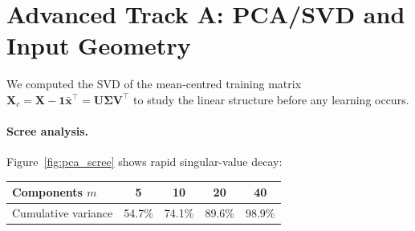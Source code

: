 \documentclass[11pt]{article}
\newcommand{\R}{\mathbb{R}}
\newcommand{\bx}{\mathbf{x}}
\newcommand{\bX}{\mathbf{X}}
\newcommand{\bone}{\mathbf{1}}
\begin{document}



\section{Advanced Track A: PCA/SVD and Input Geometry}
\label{sec:pca}

We computed the SVD of the mean-centred training matrix
$\bX_c = \bX - \bone\bar{\bx}^\top = \mathbf{U}\mathbf{\Sigma}\mathbf{V}^\top$
to study the linear structure before any learning occurs.

\paragraph{Scree analysis.}
Figure~\ref{fig:pca_scree} shows rapid singular-value decay:

\begin{center}
\begin{tabular}{@{}lcccc@{}}
\toprule
Components $m$ & 5 & 10 & 20 & 40 \\
\midrule
Cumulative variance & 54.7\% & 74.1\% & 89.6\% & 98.9\% \\
\bottomrule
\end{tabular}
\end{center}
\end{document}
